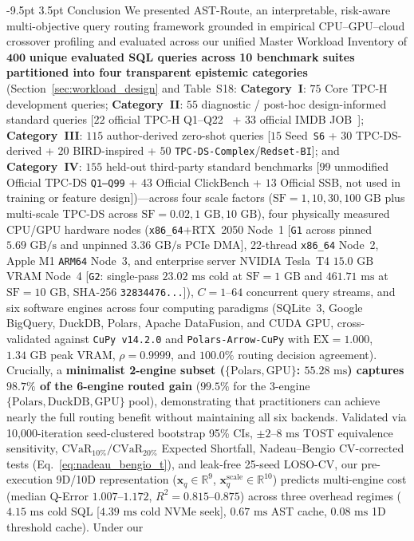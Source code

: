\documentclass[10pt,a4paper]{article}
\makeatletter
\renewcommand\section{\@startsection{section}{1}{\z@}%
  {-9.5pt \@plus -2pt \@minus -1.5pt}%
  {3.5pt \@plus 1pt}%
  {\normalfont\large\bfseries}}
\makeatother
\begin{document}
\vspace{-6pt}
\section{Conclusion}
\enlargethispage{1.5\baselineskip}
\vspace{-3pt}
We presented AST-Route, an interpretable, risk-aware multi-objective query routing framework grounded in empirical CPU--GPU--cloud crossover profiling and evaluated across our unified Master Workload Inventory of $\mathbf{400}$ \textbf{unique evaluated SQL queries across 10 benchmark suites partitioned into four transparent epistemic categories} (Section~\ref{sec:workload_design} and Table~S18: \textbf{Category~I}: $75$ Core TPC-H development queries; \textbf{Category~II}: $55$ diagnostic / post-hoc design-informed standard queries [$22$ official TPC-H Q1--Q22~\cite{tpc2022tpch} + $33$ official IMDB JOB~\cite{leis2015job}]; \textbf{Category~III}: $115$ author-derived zero-shot queries [$15$ Seed~\texttt{S6} + $30$ TPC-DS-derived + $20$ BIRD-inspired + $50$ \texttt{TPC-DS-Complex}/\texttt{Redset-BI}]; and \textbf{Category~IV}: $155$ held-out third-party standard benchmarks [$99$ unmodified Official TPC-DS \texttt{Q1--Q99} + $43$ Official ClickBench + $13$ Official SSB, not used in training or feature design])---across four scale factors ($\text{SF}=1, 10, 30, 100\text{ GB}$ plus multi-scale TPC-DS across $\text{SF}=0.02, 1\text{ GB}, 10\text{ GB}$), four physically measured CPU/GPU hardware nodes (\texttt{x86\_64}+RTX~2050 Node~1 [\texttt{G1} across pinned $5.69\text{ GB/s}$ and unpinned $3.36\text{ GB/s}$ PCIe DMA], 22-thread \texttt{x86\_64} Node~2, Apple M1 \texttt{ARM64} Node~3, and enterprise server NVIDIA Tesla~T4 $15.0\text{ GB}$ VRAM Node~4 [\texttt{G2}: single-pass $23.02\text{ ms}$ cold at $\text{SF}=1\text{ GB}$ and $461.71\text{ ms}$ at $\text{SF}=10\text{ GB}$, SHA-256 \texttt{32834476...}]), $C=1\text{--}64$ concurrent query streams, and six software engines across four computing paradigms (SQLite~3, Google BigQuery, DuckDB, Polars, Apache DataFusion, and CUDA GPU, cross-validated against \texttt{CuPy v14.2.0} and \texttt{Polars-Arrow-CuPy} with $\text{EX}=1.000$, $1.34\text{ GB}$ peak VRAM, $\rho=0.9999$, and $100.0\%$ routing decision agreement). Crucially, a \textbf{minimalist 2-engine subset ($\{\text{Polars}, \text{GPU}\}$: $55.28\text{ ms}$) captures $98.7\%$ of the 6-engine routed gain} ($99.5\%$ for the 3-engine $\{\text{Polars}, \text{DuckDB}, \text{GPU}\}$ pool), demonstrating that practitioners can achieve nearly the full routing benefit without maintaining all six backends. Validated via 10,000-iteration seed-clustered bootstrap 95\% CIs, $\pm 2\text{--}8\text{ ms}$ TOST equivalence sensitivity, $\text{CVaR}_{10\%}/\text{CVaR}_{20\%}$ Expected Shortfall, Nadeau--Bengio CV-corrected tests (Eq.~\ref{eq:nadeau_bengio_t}), and leak-free 25-seed LOSO-CV, our pre-execution 9D/10D representation ($\mathbf{x}_q\in\mathbb{R}^9$, $\mathbf{x}_q^{\text{scale}}\in\mathbb{R}^{10}$) predicts multi-engine cost (median Q-Error $1.007\text{--}1.172$, $R^2=0.815\text{--}0.875$) across three overhead regimes ($4.15\text{ ms}$ cold SQL [$4.39\text{ ms}$ cold NVMe seek], $0.67\text{ ms}$ AST cache, $0.08\text{ ms}$ 1D threshold cache). Under our 
\end{document}
